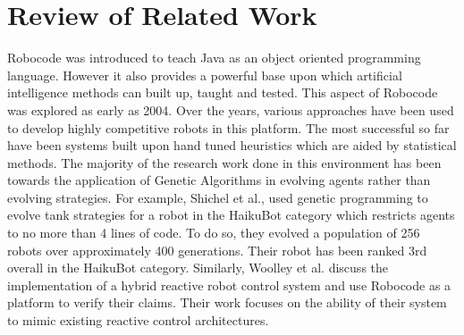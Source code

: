\documentclass{article}
\theoremstyle{plain}
\theoremstyle{definition}
\theoremstyle{remark}
\begin{document}
 
\section{Review of Related Work}

Robocode was introduced to teach Java as an object oriented programming language. However it also provides a powerful base upon which artificial intelligence methods can built up, taught and tested. This aspect of Robocode was explored as early as 2004\cite{Hartness}. Over the years, various approaches have been used to develop highly competitive robots in this platform. The most successful so far have been systems built upon hand tuned heuristics which are aided by statistical methods. The majority of the research work done in this environment has been towards the application of Genetic Algorithms in evolving agents rather than evolving strategies\cite{strategies, gp1, gp2}.  For example, Shichel et al.\cite{gp1}, used genetic programming to evolve tank strategies for a robot in the HaikuBot category which restricts agents to no more than 4 lines of code. To do so, they evolved a population of 256 robots over approximately 400 generations. Their robot has been ranked 3rd overall in the HaikuBot category. 
Similarly, Woolley et al.\cite{woolley} discuss the implementation of a hybrid reactive robot control system and use Robocode as a platform to verify their claims. Their work focuses on the ability of their system to mimic existing reactive control architectures. 
\end{document}
